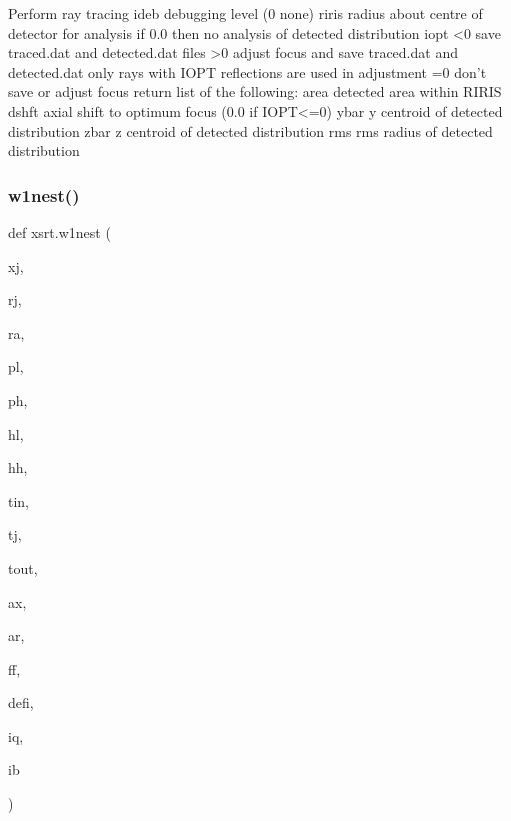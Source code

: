 \begin{DoxyVerb}Perform ray tracing
    ideb        debugging level (0 none)
    riris       radius about centre of detector for analysis
                if 0.0 then no analysis of detected distribution
    iopt        <0 save traced.dat and detected.dat files
                >0 adjust focus and save traced.dat and detected.dat
                only rays with IOPT reflections are used in adjustment
                =0 don't save or adjust focus
return list of the following:
    area        detected area within RIRIS
    dshft       axial shift to optimum focus (0.0 if IOPT<=0)
    ybar        y centroid of detected distribution
    zbar        z centroid of detected distribution
    rms         rms radius of detected distribution
\end{DoxyVerb}
 \mbox{\label{namespacexsrt_af6099938efe72e809b9bca88b0032624}} 
\subsubsection{\texorpdfstring{w1nest()}{w1nest()}}
{\footnotesize\ttfamily def xsrt.\+w1nest (\begin{DoxyParamCaption}\item[{}]{xj,  }\item[{}]{rj,  }\item[{}]{ra,  }\item[{}]{pl,  }\item[{}]{ph,  }\item[{}]{hl,  }\item[{}]{hh,  }\item[{}]{tin,  }\item[{}]{tj,  }\item[{}]{tout,  }\item[{}]{ax,  }\item[{}]{ar,  }\item[{}]{ff,  }\item[{}]{defi,  }\item[{}]{iq,  }\item[{}]{ib }\end{DoxyParamCaption})}

